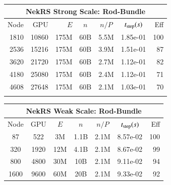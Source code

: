 
 \begin{table}[b]
 \footnotesize
 \begin{tabular}{|r|r|r|c|c|c|r|}
  \hline
  \multicolumn{7}{|c|}{{\bf NekRS Strong Scale:  Rod-Bundle}}\\
  \hline
 Node & GPU   & $E$ & $n$ & $n/P$ & $t_{\rm step} (s) $ & Eff \\
 \hline
 1810 &10860 &  175M & 60B &5.5M &1.85e-01 & 100  \\
 2536 &15216 &  175M & 60B &3.9M &1.51e-01 &  87  \\
 3620 &21720 &  175M & 60B &2.7M &1.12e-01 &  82  \\
 4180 &25080 &  175M & 60B &2.4M &1.12e-01 &  71  \\
 4608 &27648 &  175M & 60B &2.1M &1.03e-01 &  70  \\
      &      &       &     &     &         &      \\
  \hline
 \end{tabular}
 \vspace*{.3in}
 \begin{tabular}{|c|c|c|c|c|c|r|}
  \hline
  \multicolumn{7}{|c|}{{\bf NekRS Weak Scale: Rod-Bundle}}\\
  \hline
 Node & GPU &  $E$ & $n$      &  $n/P$& $t_{\rm step}(s)$ & Eff  \\
 \hline
 87   & 522   & 3M        & 1.1B  &  2.1M  & 8.57e-02  & 100   \\%
 320  & 1920  & 12M       & 4.1B  &  2.1M  & 8.67e-02  & 99    \\%
 800  & 4800  & 30M       & 10B   &  2.1M  & 9.11e-02  & 94    \\%
 1600 & 9600  & 60M       & 20B   &  2.1M  & 9.33e-02  & 92    \\%

\end{tabular}
\end{table}
